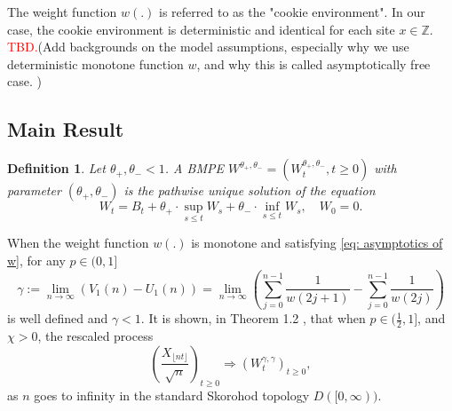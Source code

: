 \documentclass[twoside,12pt,a4paper]{article}
\newtheorem{definition}{Definition}[section]
\numberwithin{equation}{section}
\newcommand\TBD{\textcolor{red}{TBD.}}
\begin{document}
The weight function $w(.)$ is referred to as the "cookie environment". In our case, the cookie environment is deterministic and identical for each site $x\in \mathbb{Z}$. \TBD (Add backgrounds on the model assumptions, especially why we use deterministic monotone function $w$, and why this is called asymptotically free case. )

\subsection{Main Result}
\begin{definition}
	Let $\theta_+, \theta_- <1$. A BMPE $W^{\theta_+, \theta_-} = \left(W^{\theta_+, \theta_-}_t, t\geq 0\right)$ with parameter  $(\theta_+, \theta_-)$ is the pathwise unique solution of the equation
	$$
	W_t = B_t + \theta_+ \cdot \sup_{s\leq t} W_s  + \theta_- \cdot \inf_{s\leq t} W_s,   \quad W_0 = 0.
	$$
\end{definition}
When the weight function $w(.)$ is monotone and satisfying \eqref{eq: asymptotics of w}, for any $p\in (0,1]$
\begin{equation}\label{eq: gamma}
	\gamma:= \lim_{n\to \infty}\left( V_1(n) - U_1(n) \right) =\lim_{n\to \infty} \left( \sum_{j=0}^{n-1} \frac{1}{ w(2j+1)}-  \sum_{j=0}^{n-1}  \frac{1}{w(2j)} \right) 
\end{equation}
is well defined and $\gamma<1$. It is shown, in Theorem 1.2 \cite{KMP22}, that when $p\in (\frac{1}{2},1]$, and $\mathcal{\chi} >0 $, the rescaled process
$$
 \left(  \frac{X_{\lfloor nt \rfloor }}{\sqrt{n}}  \right)_{t\geq 0} \Longrightarrow \left( W^{\gamma,\gamma}_{t}\right)_{t\geq 0},
$$ as $n$ goes to infinity in the standard Skorohod topology $D([0,\infty) ).$
\end{document}
